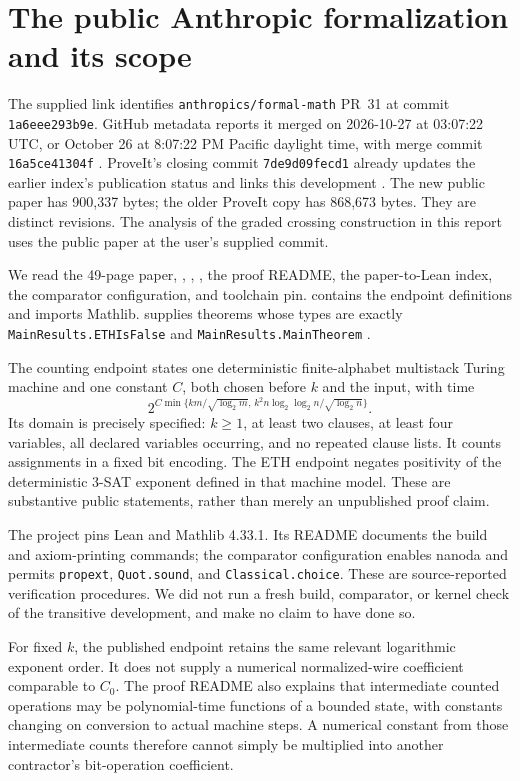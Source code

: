 \section{The public Anthropic formalization and its scope}
\label{sec:formalization}

The supplied link identifies \texttt{anthropics/formal-math} PR~31 at
commit \texttt{1a6eee293b9e}.
GitHub metadata reports it merged on 2026-10-27 at 03:07:22 UTC,
or October 26 at 8:07:22 PM Pacific daylight time, with merge commit
\texttt{16a5ce41304f}
\cite{anthropic-pr}. ProveIt's closing commit \texttt{7de9d09fecd1}
already updates the earlier index's publication status and links this
development \cite{closing}. The new public paper has 900,337 bytes;
the older ProveIt copy has 868,673 bytes. They are distinct revisions.
The analysis of the graded crossing construction in this report uses the public
paper at the user's supplied commit.

We read the 49-page paper, ,
, , the proof README,
the paper-to-Lean index, the comparator configuration, and toolchain pin.
 contains the endpoint definitions and imports
Mathlib.  supplies theorems whose types are exactly
\texttt{MainResults.ETHIsFalse} and \texttt{MainResults.MainTheorem}
\cite{anthropic-main,anthropic-solution}.

The counting endpoint states one deterministic finite-alphabet multistack
Turing machine and one constant $C$, both chosen before $k$ and the input,
with time
\[
 2^{C\min\{km/\sqrt{\log_2m},\,
           k^2n\log_2\log_2n/\sqrt{\log_2n}\}}.
\]
Its domain is precisely specified: $k\ge1$, at least two clauses, at least
four variables, all declared variables occurring, and no repeated clause
lists. It counts assignments in a fixed bit encoding. The ETH endpoint
negates positivity of the deterministic 3-SAT exponent defined in that
machine model. These are substantive public statements, rather than merely
an unpublished proof claim.

The project pins Lean and Mathlib 4.33.1. Its README documents the build and
axiom-printing commands; the comparator configuration enables nanoda and
permits \texttt{propext}, \texttt{Quot.sound}, and
\texttt{Classical.choice}. These are source-reported verification procedures.
We did not run a fresh build, comparator, or kernel check of the transitive
development, and make no claim to have done so.

For fixed $k$, the published endpoint retains the same relevant logarithmic
exponent order. It does not supply a numerical normalized-wire coefficient
comparable to $C_0$. The proof README also explains that intermediate
counted operations may be polynomial-time functions of a bounded state,
with constants changing on conversion to actual machine steps. A numerical
constant from those intermediate counts therefore cannot simply be
multiplied into another contractor's bit-operation coefficient.

